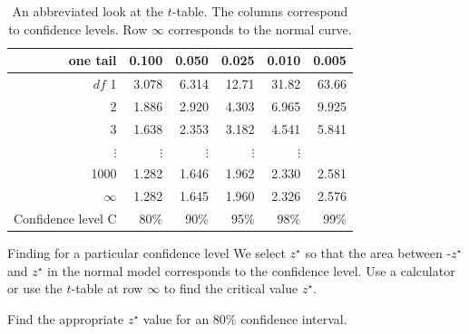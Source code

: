 \begin{table}[hht]
\centering
\begin{tabular}{r | rrr rr}
one tail & \hspace{1.5mm}  0.100 & \hspace{1.5mm} 0.050 & \hspace{1.5mm} 0.025 & \hspace{1.5mm} 0.010 & \hspace{1.5mm} 0.005  \\
\hline
{$df$} \hfill 1  &  {\normalsize  3.078} & {\normalsize  6.314} & {\normalsize 12.71} & {\normalsize 31.82} & {\normalsize 63.66}  \\ 
2  &  {\normalsize  1.886} & {\normalsize  2.920} & {\normalsize  4.303} & {\normalsize  6.965} & {\normalsize  9.925}  \\ 
3  &  {\normalsize  1.638} & {\normalsize  2.353} & {\normalsize  3.182} & {\normalsize  4.541} & {\normalsize  5.841}  \\ 
$\vdots$ & $\vdots$ &$\vdots$ &$\vdots$ &$\vdots$ & \\
1000  &  {\normalsize  1.282} & {\normalsize  1.646} & {\normalsize  1.962} & {\normalsize  2.330} & {\normalsize  2.581}  \\ 
$\infty$   &  {\normalsize  1.282} & {\normalsize  1.645} & {\normalsize  1.960} & {\normalsize  2.326} & {\normalsize  2.576}   \\
\hline
Confidence level C  &  {\normalsize  80\%} & {\normalsize 90\%} & {\normalsize 95\%} & {\normalsize  98\%} & {\normalsize  99\%}  \\
\hline
\end{tabular}
\caption{An abbreviated look at the $t$-table. The columns correspond to confidence levels. Row $\infty$ corresponds to the normal curve.}
\label{tTableSample}
\end{table}


\begin{onebox}{Finding for a particular confidence level}
We select $z^{\star}$ so that the area between -$z^{\star}$ and $z^{\star}$ in the normal model corresponds to the confidence level. Use a calculator or use the $t$-table at row $\infty$ to find the critical value $z^{\star}$.\end{onebox}

\begin{exercisewrap}
\begin{nexercise} \label{find90CIForRun10AgeExercise}
Find the appropriate $z^{\star}$ value for an 80\% confidence interval.\footnotemark
\end{nexercise}
\end{exercisewrap}

